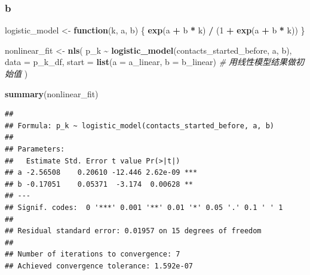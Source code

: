 \documentclass[
]{article}
\newenvironment{Shaded}{\begin{snugshade}}{\end{snugshade}}
\newcommand{\AttributeTok}[1]{\textcolor[rgb]{0.13,0.29,0.53}{#1}}
\newcommand{\CommentTok}[1]{\textcolor[rgb]{0.56,0.35,0.01}{\textit{#1}}}
\newcommand{\ControlFlowTok}[1]{\textcolor[rgb]{0.13,0.29,0.53}{\textbf{#1}}}
\newcommand{\DecValTok}[1]{\textcolor[rgb]{0.00,0.00,0.81}{#1}}
\newcommand{\FunctionTok}[1]{\textcolor[rgb]{0.13,0.29,0.53}{\textbf{#1}}}
\newcommand{\NormalTok}[1]{#1}
\newcommand{\OtherTok}[1]{\textcolor[rgb]{0.56,0.35,0.01}{#1}}
\newcommand{\SpecialCharTok}[1]{\textcolor[rgb]{0.81,0.36,0.00}{\textbf{#1}}}
\begin{document}
\subsubsection{b}\label{b-1}

\begin{Shaded}
\begin{Highlighting}[]
\NormalTok{logistic\_model }\OtherTok{\textless{}{-}} \ControlFlowTok{function}\NormalTok{(k, a, b) \{}
  \FunctionTok{exp}\NormalTok{(a }\SpecialCharTok{+}\NormalTok{ b }\SpecialCharTok{*}\NormalTok{ k) }\SpecialCharTok{/}\NormalTok{ (}\DecValTok{1} \SpecialCharTok{+} \FunctionTok{exp}\NormalTok{(a }\SpecialCharTok{+}\NormalTok{ b }\SpecialCharTok{*}\NormalTok{ k))}
\NormalTok{\}}


\NormalTok{nonlinear\_fit }\OtherTok{\textless{}{-}} \FunctionTok{nls}\NormalTok{(}
\NormalTok{  p\_k }\SpecialCharTok{\textasciitilde{}} \FunctionTok{logistic\_model}\NormalTok{(contacts\_started\_before, a, b), }
  \AttributeTok{data =}\NormalTok{ p\_k\_df, }
  \AttributeTok{start =} \FunctionTok{list}\NormalTok{(}\AttributeTok{a =}\NormalTok{ a\_linear, }\AttributeTok{b =}\NormalTok{ b\_linear)  }\CommentTok{\# 用线性模型结果做初始值}
\NormalTok{)}


\FunctionTok{summary}\NormalTok{(nonlinear\_fit)}
\end{Highlighting}
\end{Shaded}

\begin{verbatim}
## 
## Formula: p_k ~ logistic_model(contacts_started_before, a, b)
## 
## Parameters:
##   Estimate Std. Error t value Pr(>|t|)    
## a -2.56508    0.20610 -12.446 2.62e-09 ***
## b -0.17051    0.05371  -3.174  0.00628 ** 
## ---
## Signif. codes:  0 '***' 0.001 '**' 0.01 '*' 0.05 '.' 0.1 ' ' 1
## 
## Residual standard error: 0.01957 on 15 degrees of freedom
## 
## Number of iterations to convergence: 7 
## Achieved convergence tolerance: 1.592e-07
\end{verbatim}
\end{document}
